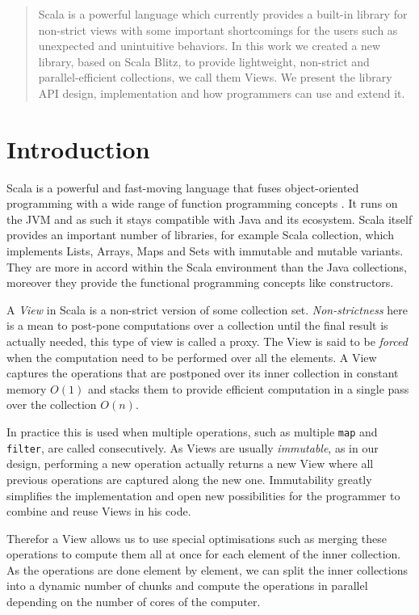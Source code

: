 \documentclass[a4paper,12pt,twocolumn]{article}
\begin{document}
\begin{abstract}
Scala is a powerful language which currently provides a built-in library for non-strict views with some important shortcomings for the users such as unexpected and unintuitive behaviors.
In this work we created a new library, based on Scala Blitz, to provide lightweight, non-strict and parallel-efficient collections, we call them Views.
We present the library API design, implementation and how programmers can use and extend it.
\end{abstract}

\section{Introduction}
Scala is a powerful and fast-moving language that fuses object-oriented programming with a wide range of function programming concepts \cite{scala-overview}.
It runs on the JVM and as such it stays compatible with Java and its ecosystem.
Scala itself provides an important number of libraries, for example Scala collection, which implements Lists, Arrays, Maps and Sets with immutable and mutable variants.
They are more in accord within the Scala environment than the Java collections, moreover they provide the functional programming concepts like constructors.

A {\it View} in Scala is a non-strict version of some collection set.
{\it Non-strictness} here is a mean to post-pone computations over a collection until the final result is actually needed, this type of view is called a proxy.
The View is said to be {\it forced} when the computation need to be performed over all the elements.
A View captures the operations that are postponed over its inner collection in constant memory $O(1)$ and stacks them to provide efficient computation in a single pass over the collection $O(n)$.

In practice this is used when multiple operations, such as multiple \verb|map| and \verb|filter|, are called consecutively.
As Views are usually {\it immutable}, as in our design, performing a new operation actually returns a new View where all previous operations are captured along the new one.
Immutability greatly simplifies the implementation and open new possibilities for the programmer to combine and reuse Views in his code.

Therefor a View allows us to use special optimisations such as merging these operations to compute them all at once for each element of the inner collection.
As the operations are done element by element, we can split the inner collections into a dynamic number of chunks and compute the operations in parallel depending on the number of cores of the computer.
\end{document}
